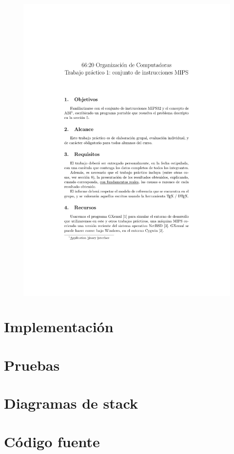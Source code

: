 \documentclass[a4paper, 12pt]{article}
\begin{document}
	\newpage
	\begin{figure}[H]
		\centering
		\includegraphics[scale=1, page = 5, clip, trim=20mm 36mm 20mm 20mm]{files/enunciado.pdf}
	\end{figure}
	
	
	

	\section{Implementación}
	
	\section{Pruebas}
	
	\section{Diagramas de stack}
	
	\section{Código fuente}
\end{document}
